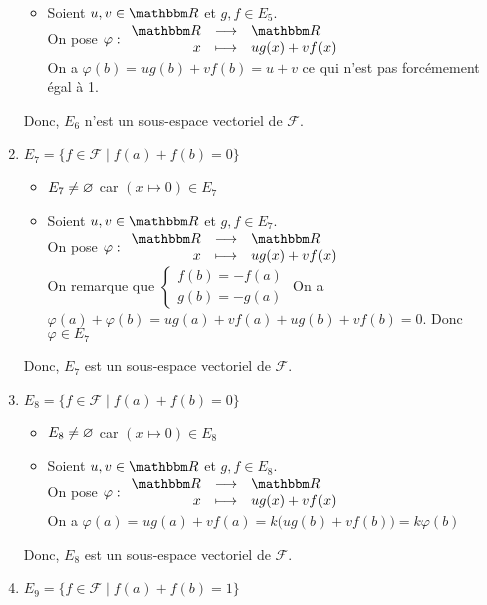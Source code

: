 \begin{enumerate}
\begin{itemize}
			\item Soient  $u,v \in \R$ et $g, f \in E_5$.\\
				On pose $\varphi : \begin{array}{rcl}
					\R &\longrightarrow& \R \\
					x &\longmapsto& ug(x) + vf(x)
				\end{array}$\\
				On a $\varphi(b) = ug(b) + vf(b) = u + v$ ce qui n'est pas forcémement égal à 1.
		\end{itemize}
		Donc, $E_6$ n'est un sous-espace vectoriel de $\mathcal{F}$.
	\item $E_7 = \{f \in \mathcal{F} \mid f(a) + f(b) = 0\}$
		\begin{itemize}
			\item $E_7 \neq \varnothing$ car $(x\mapsto 0) \in E_7$ 
			\item Soient  $u,v \in \R$ et $g, f \in E_7$.\\
				On pose $\varphi : \begin{array}{rcl}
					\R &\longrightarrow& \R \\
					x &\longmapsto& ug(x) + vf(x)
				\end{array}$\\
				On remarque que $\begin{cases}
					f(b) = -f(a)\\
					g(b) = -g(a)
				\end{cases}$
				On a $\varphi(a) + \varphi(b) = ug(a) + vf(a) + ug(b) + vf(b) = 0$. Donc $\varphi \in E_7$
		\end{itemize}
		Donc, $E_7$ est un sous-espace vectoriel de $\mathcal{F}$.
	\item $E_8 = \{f \in \mathcal{F} \mid f(a) + f(b) = 0\}$
		\begin{itemize}
			\item $E_8 \neq \varnothing$ car $(x\mapsto 0) \in E_8$ 
			\item Soient  $u,v \in \R$ et $g, f \in E_8$.\\
				On pose $\varphi : \begin{array}{rcl}
					\R &\longrightarrow& \R \\
					x &\longmapsto& ug(x) + vf(x)
				\end{array}$\\
				On a $\varphi(a) = ug(a) + vf(a) = k\big(ug(b) + vf(b)\big) = k\varphi(b)$
		\end{itemize}
		Donc, $E_8$ est un sous-espace vectoriel de $\mathcal{F}$.
	\item $E_9 = \{f \in \mathcal{F} \mid f(a) + f(b) = 1\}$

\end{enumerate}
